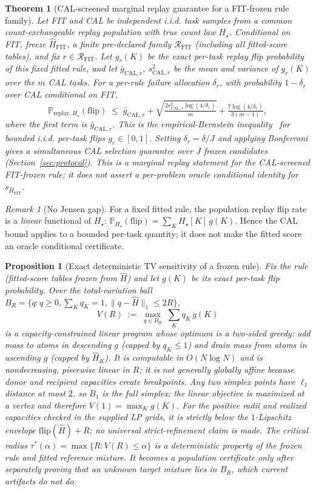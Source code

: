 \documentclass{article}
\newtheorem{theorem}{Theorem}
\newtheorem{proposition}{Proposition}
\theoremstyle{definition}
\theoremstyle{remark}
\newtheorem{remark}{Remark}
\newcommand{\flip}{\mathrm{flip}}
\newcommand{\calD}{\mathrm{CAL}}
\newcommand{\trueH}{H_\star}
\newcommand{\fitscore}{s_{\widehat H_{\mathrm{FIT}}}}
\renewcommand{\P}{\mathbb{P}}
\begin{document}
\begin{theorem}[CAL-screened marginal replay guarantee for a FIT-frozen rule family]
\label{thm:pop}
Let FIT and CAL be independent i.i.d. task samples from a common
count-exchangeable replay population with true count law $\trueH$. Conditional
on FIT, freeze $\widehat H_{\mathrm{FIT}}$, a finite pre-declared family
$\mathcal R_{\mathrm{FIT}}$ (including all fitted-score tables), and fix
$r\in\mathcal R_{\mathrm{FIT}}$. Let $g_r(K)$ be the exact per-task replay
flip probability of this \emph{fixed fitted rule}, and let
$\bar g_{\calD,r}$, $s^2_{\calD,r}$ be the mean and variance of $g_r(K)$ over
the $m$ CAL tasks.
For a per-rule failure allocation $\delta_r$, with probability
$1-\delta_r$ over CAL conditional on FIT,
\[
\P_{\text{replay},\trueH}(\flip) \;\le\; \bar g_{\calD,r}
+ \sqrt{\tfrac{2 s^2_{\calD,r}\log(4/\delta_r)}{m}}
+ \tfrac{7\log(4/\delta_r)}{3(m-1)},
\]
where the first term is $\bar g_{\calD,r}$.  This is the
empirical-Bernstein inequality~\citep{maurer2009eb} for bounded i.i.d.
per-task flips $g_r\in[0,1]$. Setting $\delta_r=\delta/J$ and applying
Bonferroni gives a simultaneous CAL selection guarantee over $J$ frozen
candidates (Section~\ref{sec:protocol}). This is a marginal replay statement
for the CAL-screened FIT-frozen rule; it does not assert a per-problem oracle
conditional identity for $\fitscore$.
\end{theorem}
\begin{remark}[No Jensen gap]
For a fixed fitted rule, the population replay flip rate is a \emph{linear}
functional of $\trueH$: $\P_{\trueH}(\flip)=\sum_K \trueH[K]\,g(K)$. Hence the
CAL bound applies to a bounded per-task quantity; it does not make the fitted
score an oracle conditional certificate.
\end{remark}
\begin{proposition}[Exact deterministic TV sensitivity of a frozen rule]
\label{prop:tv}
Fix the rule (fitted-score tables frozen from $\widehat H$) and let $g(K)$ be
its exact per-task flip probability. Over the total-variation ball
$B_R=\{q:q\ge0,\sum_K q_K=1,\|q-\widehat H\|_1\le 2R\}$,
\[
V(R)\;:=\;\max_{q\in B_R}\;\textstyle\sum_K q_K\,g(K)
\]
is a capacity-constrained linear program whose optimum is a two-sided greedy:
add mass to atoms in descending $g$ (capped by $q_K\le1$) and drain mass from
atoms in ascending $g$ (capped by $\widehat H_K$). It is computable in
$O(N\log N)$ and is nondecreasing, piecewise linear in $R$; it is not
generally globally affine because donor and recipient capacities create
breakpoints. Any two simplex points have $\ell_1$ distance at most $2$, so
$B_1$ is the full simplex; the linear objective is maximized at a vertex and
therefore $V(1)=\max_K g(K)$. For the positive radii and realized capacities checked in the
supplied LP grids, it is strictly below the $1$-Lipschitz envelope
$\flip(\widehat H)+R$; no universal strict-refinement claim is made. The
\emph{critical radius} $\tau^*(\alpha)=\max\{R:V(R)\le\alpha\}$ is a
deterministic property of the frozen rule and fitted reference mixture. It
becomes a population certificate only after separately proving that an unknown
target mixture lies in $B_R$, which current artifacts do not do.
\end{proposition}
\end{document}
